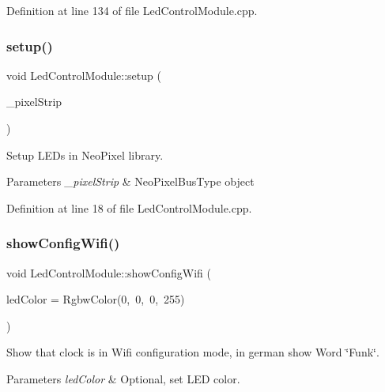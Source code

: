 Definition at line 134 of file Led\+Control\+Module.\+cpp.

\mbox{\label{class_led_control_module_ae1eb70e65006f55b30f6a034706829b5}} 
\subsubsection{\texorpdfstring{setup()}{setup()}}
{\footnotesize\ttfamily void Led\+Control\+Module\+::setup (\begin{DoxyParamCaption}\item[{\mbox{\hyperlink{_led_control_module_8h_a51a7b766d62733fca1ec20e82e024f9f}{Neo\+Pixel\+Bus\+Type}} $\ast$}]{\+\_\+pixel\+Strip }\end{DoxyParamCaption})}



Setup L\+E\+Ds in Neo\+Pixel library. 


\begin{DoxyParams}{Parameters}
{\em \+\_\+pixel\+Strip} & Neo\+Pixel\+Bus\+Type object \\
\hline
\end{DoxyParams}


Definition at line 18 of file Led\+Control\+Module.\+cpp.

\mbox{\label{class_led_control_module_a70c42e2f9baee807bfdb9fe9bd2f6d8e}} 
\subsubsection{\texorpdfstring{showConfigWifi()}{showConfigWifi()}}
{\footnotesize\ttfamily void Led\+Control\+Module\+::show\+Config\+Wifi (\begin{DoxyParamCaption}\item[{const Rgbw\+Color \&}]{led\+Color = {\ttfamily RgbwColor(0,~0,~0,~255)} }\end{DoxyParamCaption})}



Show that clock is in Wifi configuration mode, in german show Word \char`\"{}\+Funk\char`\"{}. 


\begin{DoxyParams}{Parameters}
{\em led\+Color} & Optional, set L\+ED color. \\
\hline
\end{DoxyParams}


